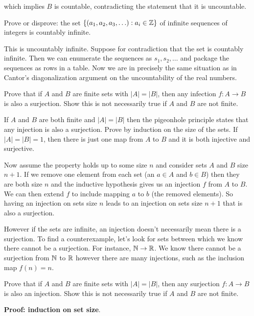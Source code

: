 \documentclass{article}
\begin{document}
which implies $B$ is countable, contradicting the statement that it is uncountable.

\begin{problem}
Prove or disprove: the set $\{(a_1, a_2, a_3, \ldots): a_i \in \mathbb{Z}\}$ of infinite sequences of integers is countably infinite.
\end{problem}

This is uncountably infinite. Suppose for contradiction that the set is countably infinite. Then we can enumerate the sequences as $s_1, s_2, \ldots$ and package the sequences as rows in a table. Now we are in precisely the same situation as in Cantor's diagonalization argument on the uncountability of the real numbers.

\begin{problem}
Prove that if $A$ and $B$ are finite sets with $|A| = |B|$, then any infection $f: A \to B$ is also a surjection. Show this is not necessarily true if $A$ and $B$ are not finite.
\end{problem}

If $A$ and $B$ are both finite and $|A| = |B|$ then the pigeonhole principle states that any injection is also a surjection. Prove by induction on the size of the sets. If $|A| = |B| = 1$, then there is just one map from $A$ to $B$ and it is both injective and surjective.

Now assume the property holds up to some size $n$ and consider sets $A$ and $B$ size $n + 1$. If we remove one element from each set (an $a \in A$ and $b \in B$) then they are both size $n$ and the inductive hypothesis gives us an injection $f$ from $A$ to $B$. We can then extend $f$ to include mapping $a$ to $b$ (the removed elements). So having an injection on sets size $n$ leads to an injection on sets size $n + 1$ that is also a surjection.

However if the sets are infinite, an injection doesn't necessarily mean there is a surjection. To find a counterexample, let's look for sets between which we know there cannot be a surjection. For instance, $\mathbb{N} \to \mathbb{R}$. We know there cannot be a surjection from $\mathbb{N}$ to $\mathbb{R}$ however there are many injections, such as the inclusion map $f(n) = n$.
\begin{problem}
Prove that if $A$ and $B$ are finite sets with $|A| = |B|$, then any surjection $f: A \to B$ is also an injection. Show this is not necessarily true if $A$ and $B$ are not finite.
\end{problem}

\textbf{Proof: induction on set size}.
\end{document}
